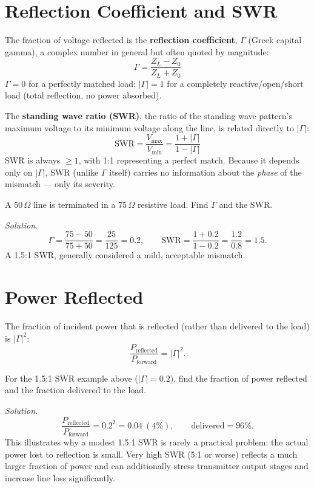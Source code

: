 \section{Reflection Coefficient and SWR}

The fraction of voltage reflected is the \textbf{reflection
coefficient}, $\Gamma$ (Greek capital gamma), a complex number in
general but often quoted by magnitude:
\[
\boxed{\Gamma = \frac{Z_L - Z_0}{Z_L + Z_0}}
\]
$\Gamma = 0$ for a perfectly matched load; $|\Gamma| = 1$ for a
completely reactive/open/short load (total reflection, no power
absorbed).

The \textbf{standing wave ratio (SWR)}, the ratio of the standing wave
pattern's maximum voltage to its minimum voltage along the line, is
related directly to $|\Gamma|$:
\[
\boxed{\text{SWR} = \frac{V_{\max}}{V_{\min}} = \frac{1+|\Gamma|}{1-|\Gamma|}}
\]
SWR is always $\geq 1$, with 1{:}1 representing a perfect match. Because
it depends only on $|\Gamma|$, SWR (unlike $\Gamma$ itself) carries no
information about the \emph{phase} of the mismatch --- only its
severity.

\begin{examplebox}
A 50\,$\Omega$ line is terminated in a 75\,$\Omega$ resistive load.
Find $\Gamma$ and the SWR.

\emph{Solution.}
\[
\Gamma = \frac{75-50}{75+50} = \frac{25}{125} = 0.2, \qquad
\text{SWR} = \frac{1+0.2}{1-0.2} = \frac{1.2}{0.8} = 1.5.
\]
A 1.5:1 SWR, generally considered a mild, acceptable mismatch.
\end{examplebox}

\section{Power Reflected}

The fraction of incident power that is reflected (rather than
delivered to the load) is $|\Gamma|^2$:
\[
\frac{P_{\text{reflected}}}{P_{\text{forward}}} = |\Gamma|^2.
\]

\begin{examplebox}
For the 1.5:1 SWR example above ($|\Gamma|=0.2$), find the fraction of
power reflected and the fraction delivered to the load.

\emph{Solution.}
\[
\frac{P_{\text{reflected}}}{P_{\text{forward}}} = 0.2^2 = 0.04\ (4\%), \qquad
\text{delivered} = 96\%.
\]
This illustrates why a modest 1.5:1 SWR is rarely a practical problem:
the actual power lost to reflection is small. Very high SWR (5:1 or
worse) reflects a much larger fraction of power and can additionally
stress transmitter output stages and increase line loss significantly.
\end{examplebox}


